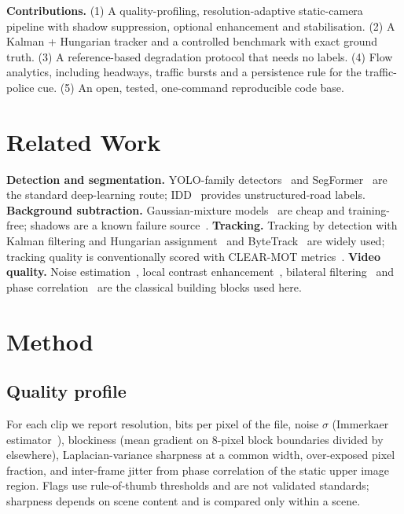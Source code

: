 \documentclass[10pt,twocolumn,a4paper]{article}
\begin{document}
\textbf{Contributions.} (1) A quality-profiling, resolution-adaptive static-camera pipeline with shadow suppression, optional enhancement and stabilisation.
(2) A Kalman + Hungarian tracker and a controlled benchmark with exact ground truth.
(3) A reference-based degradation protocol that needs no labels.
(4) Flow analytics, including headways, traffic bursts and a persistence rule for the traffic-police cue.
(5) An open, tested, one-command reproducible code base.

\section{Related Work}
\textbf{Detection and segmentation.} YOLO-family detectors~\cite{redmon2016} and SegFormer~\cite{xie2021} are the standard deep-learning route; IDD~\cite{varma2019} provides unstructured-road labels.
\textbf{Background subtraction.} Gaussian-mixture models~\cite{stauffer1999,zivkovic2004} are cheap and training-free; shadows are a known failure source~\cite{prati2003}.
\textbf{Tracking.} Tracking by detection with Kalman filtering and Hungarian assignment~\cite{kalman1960,kuhn1955,bewley2016} and ByteTrack~\cite{zhang2022} are widely used; tracking quality is conventionally scored with CLEAR-MOT metrics~\cite{bernardin2008}.
\textbf{Video quality.} Noise estimation~\cite{immerkaer1996}, local contrast enhancement~\cite{zuiderveld1994}, bilateral filtering~\cite{tomasi1998} and phase correlation~\cite{kuglin1975} are the classical building blocks used here.

\section{Method}
\subsection{Quality profile}
For each clip we report resolution, bits per pixel of the file, noise $\sigma$ (Immerkaer estimator~\cite{immerkaer1996}), blockiness (mean gradient on 8-pixel block boundaries divided by elsewhere), Laplacian-variance sharpness at a common width, over-exposed pixel fraction, and inter-frame jitter from phase correlation of the static upper image region.
Flags use rule-of-thumb thresholds and are not validated standards; sharpness depends on scene content and is compared only within a scene.
\end{document}
